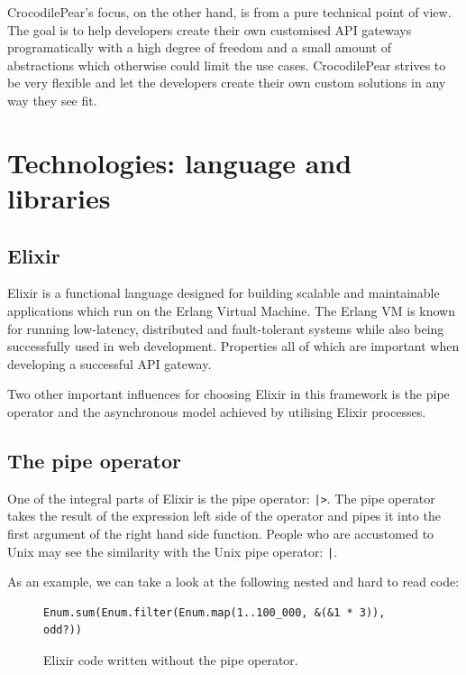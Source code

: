 \documentclass{cslthse-msc}
\begin{document}
CrocodilePear's focus, on the other hand, is from a pure technical point of view. The goal is to help developers create their own customised API gateways programatically with a high degree of freedom and a small amount of abstractions which otherwise could limit the use cases. CrocodilePear strives to be very flexible and let the developers create their own custom solutions in any way they see fit.

\section{Technologies: language and libraries}
\subsection{Elixir}
Elixir is a functional language designed for building scalable and maintainable applications which run on the Erlang Virtual Machine. The Erlang VM is known for running low-latency, distributed and fault-tolerant systems while also being successfully used in web development\cite{elixir}. Properties all of which are important when developing a successful API gateway.

Two other important influences for choosing Elixir in this framework is the pipe operator and the asynchronous model achieved by utilising Elixir processes.

\subsection{The pipe operator}
One of the integral parts of Elixir is the pipe operator: \lstinline{|>}. The pipe operator takes the result of the expression left side of the operator and pipes it into the first argument of the right hand side function. People who are accustomed to Unix may see the similarity with the Unix pipe operator: \lstinline{|}.

\vspace{5mm}

\noindent As an example, we can take a look at the following nested and hard to read code:

\begin{figure}[H]
  \centering
\begin{lstlisting}[breaklines=true,frame=single]
Enum.sum(Enum.filter(Enum.map(1..100_000, &(&1 * 3)), odd?))
\end{lstlisting}
  \caption{Elixir code written without the pipe operator.}
  \label{fig:no_pipe}
\end{figure}
\end{document}
